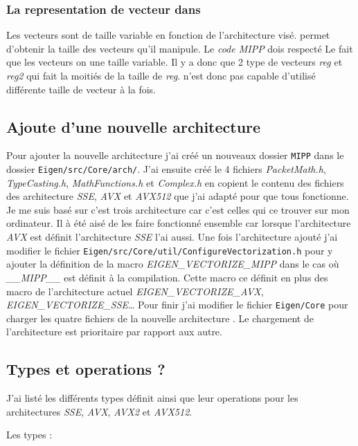 \subsubsection{La representation de vecteur dans \MIPP}
{
  Les vecteurs sont de taille variable en fonction de l'architecture visé. \MIPP permet
  d'obtenir la taille des vecteurs qu'il manipule. Le \emph{code MIPP} dois respecté
  Le fait que les vecteurs on une taille variable. Il y a donc que 2 type de vecteurs
  \emph{reg} et \emph{reg2} qui fait la moitiés de la taille de \emph{reg}.
  \MIPP n'est donc pas capable d'utilisé différente taille de vecteur à la fois.
}

\subsection{Ajoute d'une nouvelle architecture \MIPP}

Pour ajouter la nouvelle architecture \MIPP j'ai créé un nouveaux dossier \verb|MIPP|
dans le dossier \verb|Eigen/src/Core/arch/|. J'ai ensuite créé le 4 fichiers
\emph{PacketMath.h}, \emph{TypeCasting.h}, \emph{MathFunctions.h} et \emph{Complex.h}
en copient le contenu des fichiers des architecture \emph{SSE}, \emph{AVX} et \emph{AVX512}
que j'ai adapté pour que tous fonctionne. Je me suis basé sur c'est trois architecture
car c'est celles qui ce trouver sur mon ordinateur. Il à été aisé de les faire fonctionné
ensemble car lorsque l'architecture \emph{AVX} est définit l'architecture \emph{SSE} l'ai
aussi.
Une fois l'architecture ajouté j'ai modifier le fichier
\verb|Eigen/src/Core/util/ConfigureVectorization.h| pour y ajouter la définition de la
macro \emph{EIGEN_VECTORIZE_MIPP} dans le cas où \emph{__MIPP__} est définit à la
compilation. Cette macro ce définit en plus des macro de l'architecture actuel
\emph{EIGEN_VECTORIZE_AVX}, \emph{EIGEN_VECTORIZE_SSE}\dots
Pour finir j'ai modifier le fichier \verb|Eigen/Core| pour charger les quatre fichiers
de la nouvelle architecture \MIPP. Le chargement de l'architecture \MIPP est prioritaire
par rapport aux autre.

\subsection{Types et operations \Eigen ?}

J'ai listé les différents types \Eigen définit ainsi que leur operations pour les
architectures \emph{SSE}, \emph{AVX}, \emph{AVX2} et \emph{AVX512}.

Les types :

